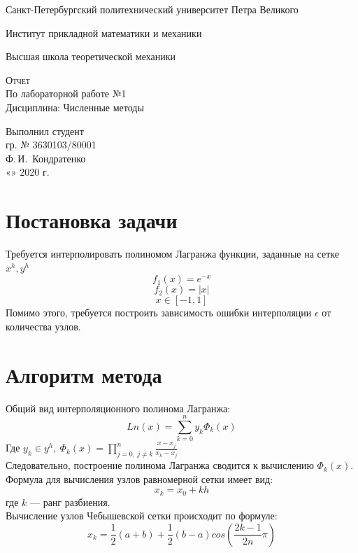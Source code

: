 \documentclass{article}
\begin{document}
\begin{titlepage}
	\begin{center}
		\bigskip
		\large
		
		Санкт-Петербургский политехнический университет Петра Великого
		\vspace{0.25cm}
		
		Институт прикладной математики и механики
		
		Высшая школа теоретической механики
		\vfill
		
		
		
		\textsc{Отчет}\\[5mm]
		
		{\LARGE По лабораторной работе №1\\
		Дисциплина: Численные методы}
		\bigskip
	\end{center}
	\vfill
	
	\newlength{\ML}
	\hfill\begin{minipage}{0.4\textwidth}
		Выполнил студент\\ гр. № 3630103/80001\\
		\underline{\hspace{\ML}} Ф.\,И.~Кондратенко\\
		«\underline{\hspace{0.7cm}}» \underline{\hspace{2cm}} 2020 г.
	\end{minipage}%
	\bigskip
	\vfill
	
\end{titlepage}

\section{Постановка задачи}
Требуется интерполировать полиномом Лагранжа функции, заданные на сетке ${x^h, y^h}$
$$f_1(x) = e^{-x}$$
$$f_2(x) = |x|$$
$$x \in [-1, 1]$$
Помимо этого, требуется построить зависимость ошибки интерполяции $\epsilon$ от количества узлов.
\section{Алгоритм метода}
Общий вид интерполяционного полинома Лагранжа:
$$Ln(x) = \sum_{k=0}^{n}y_k\Phi_k(x)$$
Где $y_k \in y^h,\ \Phi_k(x) = \prod_{j=0,\ j \neq k}^{n}\frac{x-x_j}{x_k - x_j}$\\
Следовательно, построение полинома Лагранжа сводится к вычислению $\Phi_k(x)$.\\
Формула для вычисления узлов равномерной сетки имеет вид:
$$x_k = x_0 + kh$$
где $k$ — ранг разбиения.\\
Вычисление узлов Чебышевской сетки происходит по формуле:
$$x_k = \frac{1}{2}(a+b)+\frac{1}{2}(b-a)cos(\frac{2k-1}{2n}\pi)$$
\end{document}
